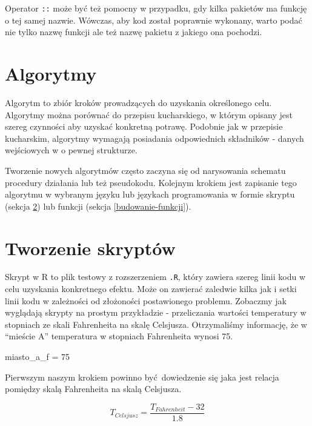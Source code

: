 \documentclass[paper=6in:9in,pagesize=pdftex,headinclude=on,footinclude=on,10pt]{scrbook}
\newenvironment{Shaded}{\begin{snugshade}}{\end{snugshade}}
\newcommand{\DecValTok}[1]{\textcolor[rgb]{0.00,0.00,0.81}{#1}}
\newcommand{\NormalTok}[1]{#1}
\newcommand{\StringTok}[1]{\textcolor[rgb]{0.31,0.60,0.02}{#1}}
\let\BeginKnitrBlock\begin \let\EndKnitrBlock\end
\begin{document}
\BeginKnitrBlock{rmdinfo}
Operator \texttt{::} może być też pomocny w przypadku, gdy kilka pakietów ma funkcję o tej samej nazwie.
Wówczas, aby kod został poprawnie wykonany, warto podać nie tylko nazwę funkcji ale też nazwę pakietu z jakiego ona pochodzi.
\EndKnitrBlock{rmdinfo}

\hypertarget{algorytmy}{%
\section{Algorytmy}\label{algorytmy}}

Algorytm to zbiór kroków prowadzących do uzyskania określonego celu.
Algorytmy można porównać do przepisu kucharskiego, w którym opisany jest szereg czynności aby uzyskać konkretną potrawę.
Podobnie jak w przepisie kucharskim, algorytmy wymagają posiadania odpowiednich składników - danych wejściowych w o pewnej strukturze.

Tworzenie nowych algorytmów często zaczyna się od narysowania schematu procedury działania lub też pseudokodu.
Kolejnym krokiem jest zapisanie tego algorytmu w wybranym języku lub językach programowania w formie skryptu (sekcja \ref{tworzenie-skryptow}) lub funkcji (sekcja \ref{budowanie-funkcji}).

\hypertarget{tworzenie-skryptow}{%
\section{Tworzenie skryptów}\label{tworzenie-skryptow}}

Skrypt w R to plik testowy z rozszerzeniem \texttt{.R}, który zawiera szereg linii kodu w celu uzyskania konkretnego efektu.
Może on zawierać zaledwie kilka jak i setki linii kodu w zależności od złożoności postawionego problemu.
Zobaczmy jak wyglądają skrypty na prostym przykładzie - przeliczania wartości temperatury w stopniach ze skali Fahrenheita na skalę Celsjusza.
Otrzymaliśmy informację, że w ``mieście A'' temperatura w stopniach Fahrenheita wynosi 75.

\begin{Shaded}
\begin{Highlighting}[]
\NormalTok{miasto_a_f =}\StringTok{ }\DecValTok{75}
\end{Highlighting}
\end{Shaded}

Pierwszym naszym krokiem powinno być~dowiedzenie się jaka jest relacja pomiędzy skalą Fahrenheita na skalą Celsjusza.

\[T_{Celsjusz} = \frac{T_{Fahrenheit} - 32}{1.8}\]
\end{document}
